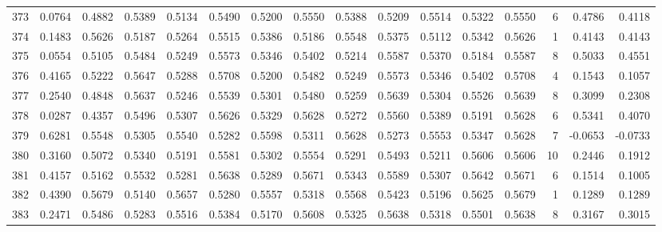 \begin{tabular}{lrrrrrrrrrrrrrrr}
373 &      0.0764 &  0.4882 &  0.5389 &  0.5134 &  0.5490 &  0.5200 &  0.5550 &  0.5388 &  0.5209 &  0.5514 &   0.5322 &     0.5550 &      6 &                    0.4786 &                     0.4118 \\
374 &      0.1483 &  0.5626 &  0.5187 &  0.5264 &  0.5515 &  0.5386 &  0.5186 &  0.5548 &  0.5375 &  0.5112 &   0.5342 &     0.5626 &      1 &                    0.4143 &                     0.4143 \\
375 &      0.0554 &  0.5105 &  0.5484 &  0.5249 &  0.5573 &  0.5346 &  0.5402 &  0.5214 &  0.5587 &  0.5370 &   0.5184 &     0.5587 &      8 &                    0.5033 &                     0.4551 \\
376 &      0.4165 &  0.5222 &  0.5647 &  0.5288 &  0.5708 &  0.5200 &  0.5482 &  0.5249 &  0.5573 &  0.5346 &   0.5402 &     0.5708 &      4 &                    0.1543 &                     0.1057 \\
377 &      0.2540 &  0.4848 &  0.5637 &  0.5246 &  0.5539 &  0.5301 &  0.5480 &  0.5259 &  0.5639 &  0.5304 &   0.5526 &     0.5639 &      8 &                    0.3099 &                     0.2308 \\
378 &      0.0287 &  0.4357 &  0.5496 &  0.5307 &  0.5626 &  0.5329 &  0.5628 &  0.5272 &  0.5560 &  0.5389 &   0.5191 &     0.5628 &      6 &                    0.5341 &                     0.4070 \\
379 &      0.6281 &  0.5548 &  0.5305 &  0.5540 &  0.5282 &  0.5598 &  0.5311 &  0.5628 &  0.5273 &  0.5553 &   0.5347 &     0.5628 &      7 &                   -0.0653 &                    -0.0733 \\
380 &      0.3160 &  0.5072 &  0.5340 &  0.5191 &  0.5581 &  0.5302 &  0.5554 &  0.5291 &  0.5493 &  0.5211 &   0.5606 &     0.5606 &     10 &                    0.2446 &                     0.1912 \\
381 &      0.4157 &  0.5162 &  0.5532 &  0.5281 &  0.5638 &  0.5289 &  0.5671 &  0.5343 &  0.5589 &  0.5307 &   0.5642 &     0.5671 &      6 &                    0.1514 &                     0.1005 \\
382 &      0.4390 &  0.5679 &  0.5140 &  0.5657 &  0.5280 &  0.5557 &  0.5318 &  0.5568 &  0.5423 &  0.5196 &   0.5625 &     0.5679 &      1 &                    0.1289 &                     0.1289 \\
383 &      0.2471 &  0.5486 &  0.5283 &  0.5516 &  0.5384 &  0.5170 &  0.5608 &  0.5325 &  0.5638 &  0.5318 &   0.5501 &     0.5638 &      8 &                    0.3167 &                     0.3015 \\

\end{tabular}
